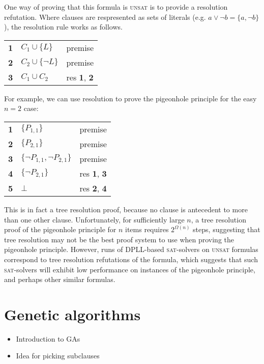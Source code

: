 \documentclass[11pt]{article}
\begin{document}
One way of proving that this formula is \textsc{unsat} is to provide a resolution refutation. Where clauses are respresented as sets of literals (e.g. $a \vee \neg b = \{a, \neg b\}$), the resolution rule works as follows.

\begin{table}[h]
\begin{tabular}{lll}
{\bf 1} & $C_1 \cup \{L\}$ & premise \\
{\bf 2} & $C_2 \cup \{\neg L\}$ & premise \\
{\bf 3} & $C_1 \cup C_2$ & res {\bf 1}, {\bf 2}
\end{tabular}
\end{table}

For example, we can use resolution to prove the pigeonhole principle for the easy $n = 2$ case:

\begin{table}[h]
\begin{tabular}{lll}
{\bf 1} & $\{P_{1,1}\}$ & premise \\
{\bf 2} & $\{P_{2,1}\}$ & premise \\
{\bf 3} & $\{\neg P_{1,1}, \neg P_{2,1}\}$ & premise \\
{\bf 4} & $\{\neg P_{2,1}\}$ & res {\bf 1}, {\bf 3} \\
{\bf 5} & $\bot$ & res {\bf 2}, {\bf 4}
\end{tabular}
\end{table}

This is in fact a tree resolution proof, because no clause is antecedent to more than one other clause. Unfortunately, for sufficiently large $n$, a tree resolution proof of the pigeonhole principle for $n$ items requires $2^{\Omega(n)}$ steps, suggesting that tree resolution may not be the best proof system to use when proving the pigeonhole principle.
However, runs of DPLL-based \textsc{sat}-solvers on \textsc{unsat} formulas correspond to tree resolution refutations of the formula, which suggests that such \textsc{sat}-solvers will exhibit low performance on instances of the pigeonhole principle, and perhaps other similar formulas.


\section{Genetic algorithms}

\begin{itemize}
  \item Introduction to GAs
  \item Idea for picking subclauses
\end{itemize}
\end{document}
